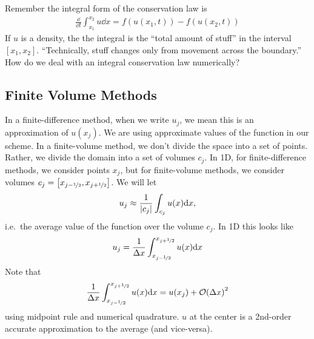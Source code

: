 \documentclass{article}
\newcommand{\half}{\nicefrac{1}{2}}
\newcommand{\Dx}{\Delta x}
\begin{document}
        Remember the integral form of the conservation law is
        \begin{align*}
            \frac{\dd}{\dd t}\int_{x_1}^{x_2}u \dd x = f(u(x_1,t)) - f(u(x_2,t))
        \end{align*}
        If $u$ is a density, the the integral is the ``total amount of stuff'' in the interval $[x_1,x_2]$.  ``Technically, stuff changes only from movement across the boundary.''  How do we deal with an integral conservation law numerically?

        \subsection{Finite Volume Methods}

            In a finite-difference method, when we write $u_j$, we mean this is an approximation of $u(x_j)$.  We are using approximate values of the function in our scheme.  In a finite-volume method, we don't divide the space into a set of points.  Rather, we divide the domain into a set of volumes $c_j$.  In 1D, for finite-difference methods, we consider points $x_j$, but for finite-volume methods, we consider volumes $c_j = \qty[x_{j-\half}, x_{j+\half}]$.  We will let $$u_j \approx \frac{1}{\abs{c_j}}\int_{c_j}u(x)\dd x,$$ i.e.~the average value of the function over the volume $c_j$.  In 1D this looks like
            \begin{align*}
                u_j = \frac{1}{\Dx}\int_{x_{j-\half}}^{x_{j+\half}}u(x)\dd x
            \end{align*}
            Note that
            \begin{align*}
                \frac{1}{\Dx}\int_{x_{j-\half}}^{x_{j+\half}}u(x)\dd x = u(x_j) + \order{\Dx}^2
            \end{align*}
            using midpoint rule and numerical quadrature.  $u$ at the center is a 2nd-order accurate approximation to the average (and vice-versa).
\end{document}
